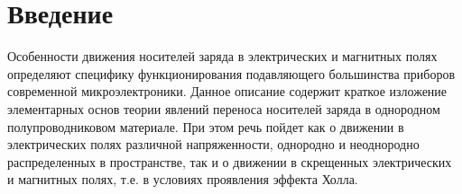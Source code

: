 \documentclass[a4paper,14pt]{extarticle}
\def\labauthors{Есюнин Д.В., Есюнин М.В.}
\def\labnumber{1}
\def\labtheme{Движение носителей заряда в электрических и магнитных полях}
\begin{document}
%			
%			
%			
%			
%			
%		
%		
%		
%		
	
\section*{Введение}
	Особенности движения носителей заряда в электрических и магнитных
полях определяют специфику функционирования подавляющего большинства
приборов современной микроэлектроники. Данное описание содержит краткое
изложение элементарных основ теории явлений переноса носителей заряда в 
однородном полупроводниковом материале. При этом речь пойдет как о движении
в электрических полях различной напряженности, однородно и неоднородно
распределенных в пространстве, так и о движении в скрещенных электрических
и магнитных полях, т.е. в условиях проявления эффекта Холла.
\end{document}
